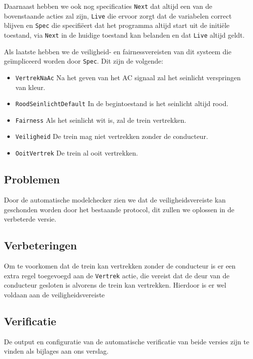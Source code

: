 \documentclass[a4paper,10pt]{article}
\begin{document}
Daarnaast hebben we ook nog specificaties \texttt{Next} dat altijd een van de 
bovenstaande acties zal zijn, \texttt{Live} die ervoor zorgt dat de 
variabelen correct blijven en \texttt{Spec} die specifi\"eert dat het programma
altijd start uit de initi\"ele toestand, via \texttt{Next} in de huidige toestand 
kan belanden en dat \texttt{Live} altijd geldt.  

Als laatste hebben we de veiligheid- en fairnessvereisten van dit systeem die 
ge\"impliceerd worden door \texttt{Spec}. Dit zijn de volgende: 

\begin{itemize}
    \item \texttt{VertrekNaAc} Na het geven van het AC signaal zal het seinlicht 
    verspringen van kleur.
    \item \texttt{RoodSeinlichtDefault} In de begintoestand is het seinlicht 
    altijd rood.
    \item \texttt{Fairness} Als het seinlicht wit is, zal de trein vertrekken.
    \item \texttt{Veiligheid} De trein mag niet vertrekken zonder de conducteur.
    \item \texttt{OoitVertrek} De trein al ooit vertrekken.
\end{itemize}

\subsection{Problemen}

Door de automatische modelchecker zien we dat de veiligheidsvereiste kan 
geschonden worden door het bestaande protocol, dit zullen we oplossen in de 
verbeterde versie.

\subsection{Verbeteringen}

Om te voorkomen dat de trein kan vertrekken zonder de conducteur is er een extra 
regel toegevoegd aan de \texttt{Vertrek} actie, die vereist dat de deur van de 
conducteur gesloten is alvorens de trein kan vertrekken. Hierdoor is er wel 
voldaan aan de veiligheidsvereiste

\subsection{Verificatie}

De output en configuratie van de automatische verificatie van beide versies zijn 
te vinden als bijlages aan ons verslag.
\end{document}
